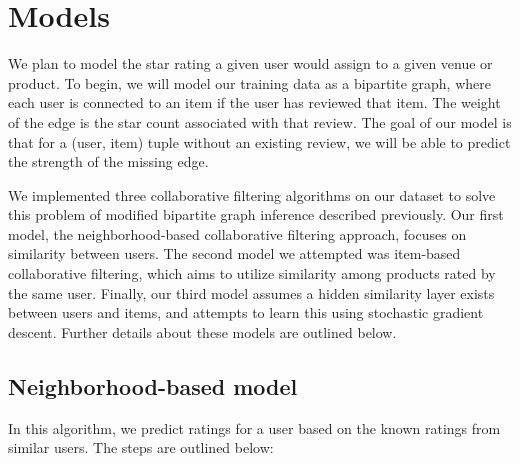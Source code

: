 \documentclass[letterpaper, 11 pt, conference]{ieeeconf}
\begin{document}



\section{Models}
\label{sec:models}

We plan to model the star rating a given user would assign to a given
venue or product. To begin, we will model our training data as a bipartite
graph, where each user is connected to an item if the user has reviewed
that item. The weight of the edge is the star count associated with that
review. The goal of our model is that for a (user, item) tuple without an
existing review, we will be able to predict the strength of the missing
edge.

We implemented three collaborative filtering algorithms on our dataset to
solve this problem of modified bipartite graph inference described
previously. Our first model, the neighborhood-based collaborative
filtering approach, focuses on similarity between users. The second model
we attempted was item-based collaborative filtering, which aims to utilize
similarity among products rated by the same user. Finally, our third model
assumes a hidden similarity layer exists between users and items, and
attempts to learn this using stochastic gradient descent. Further details
about these models are outlined below.

\subsection{Neighborhood-based model}

In this algorithm, we predict ratings for a user based on the known
ratings from similar users. The steps are outlined below:
\end{document}
